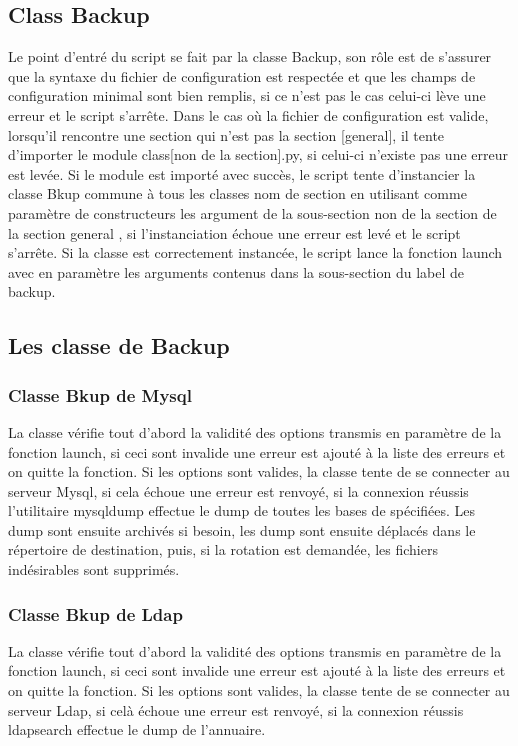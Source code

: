 \subsection*{Class Backup}
Le point d'entré du script se fait par la classe Backup, son rôle est de s'assurer que la syntaxe du fichier de configuration est respectée et que les champs de configuration minimal sont bien remplis, si ce n'est pas le cas celui-ci lève une erreur et le script s'arrête.
Dans le cas où la fichier de configuration est valide, lorsqu'il rencontre une section qui n'est pas la section [general], il tente d'importer le module class[non de la section].py, si celui-ci n'existe pas une erreur est levée.
Si le module est importé avec succès, le script tente d'instancier la classe Bkup commune à tous les classes nom de section en utilisant comme paramètre de constructeurs les argument de la sous-section  non de la section de la section general , si l'instanciation échoue une erreur est levé et le script s'arrête.
Si la classe est correctement instancée, le script lance la fonction launch avec en paramètre les arguments contenus dans la sous-section du label de backup.

\subsection*{Les classe de Backup}

\subsubsection*{Classe Bkup de Mysql}
La classe vérifie tout d'abord la validité des options transmis en paramètre de la fonction launch, si ceci sont invalide une erreur est ajouté à la liste des erreurs et on quitte la fonction.
Si les options sont valides, la classe tente de se connecter au serveur Mysql, si cela échoue une erreur est renvoyé, si la connexion réussis l'utilitaire mysqldump effectue le dump de toutes les bases de spécifiées.
Les dump sont ensuite archivés si besoin, les dump sont ensuite déplacés dans le répertoire de destination, puis, si la rotation est demandée, les fichiers indésirables sont supprimés.

\newpage

\subsubsection*{Classe Bkup de Ldap}
La classe vérifie tout d'abord la validité des options transmis en paramètre de la fonction launch, si ceci sont invalide une erreur est ajouté à la liste des erreurs et on quitte la fonction.
Si les options sont valides, la classe tente de se connecter au serveur Ldap, si celà échoue une erreur est renvoyé, si la connexion réussis ldapsearch effectue le dump de l'annuaire.

